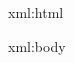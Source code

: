%
%

\startxmlsetups xml:html
\stopxmlsetups

\startxmlsetups xml:body
  \startbodymatter
  \stopbodymatter
\stopxmlsetups

